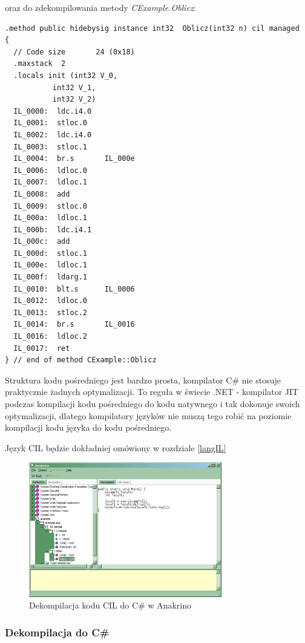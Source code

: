 oraz do zdekompilowania metody {\em CExample.Oblicz}:

\begin{scriptsize}
\begin{verbatim}
.method public hidebysig instance int32  Oblicz(int32 n) cil managed
{
  // Code size       24 (0x18)
  .maxstack  2
  .locals init (int32 V_0,
           int32 V_1,
           int32 V_2)
  IL_0000:  ldc.i4.0
  IL_0001:  stloc.0
  IL_0002:  ldc.i4.0
  IL_0003:  stloc.1
  IL_0004:  br.s       IL_000e
  IL_0006:  ldloc.0
  IL_0007:  ldloc.1
  IL_0008:  add
  IL_0009:  stloc.0
  IL_000a:  ldloc.1
  IL_000b:  ldc.i4.1
  IL_000c:  add
  IL_000d:  stloc.1
  IL_000e:  ldloc.1
  IL_000f:  ldarg.1
  IL_0010:  blt.s      IL_0006
  IL_0012:  ldloc.0
  IL_0013:  stloc.2
  IL_0014:  br.s       IL_0016
  IL_0016:  ldloc.2
  IL_0017:  ret
} // end of method CExample::Oblicz
\end{verbatim}
\end{scriptsize}

Struktura kodu pośredniego jest bardzo prosta, kompilator C\# nie stosuje praktycznie żadnych
optymalizacji. To reguła w świecie .NET - kompilator JIT podczas kompilacji kodu pośredniego do
kodu natywnego i tak dokonuje swoich optymalizacji, dlatego kompilatory języków nie muszą tego
robić na poziomie kompilacji kodu języka do kodu pośredniego.

Język CIL będzie dokładniej omówiony w rozdziale \ref{langIL}

\begin{figure}
\begin{center}
\includegraphics[width=0.75\textwidth]{./pic/w05}
\caption{Dekompilacja kodu CIL do C\# w Anakrino}
\end{center}
\end{figure}

\subsubsection{Dekompilacja do C\#}

